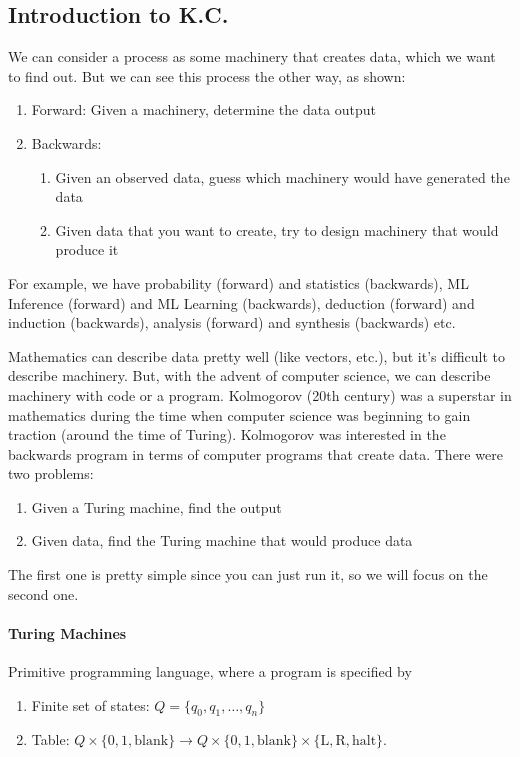 \documentclass[12pt]{article}
\theoremstyle{remark}
\begin{document}
\subsection{Introduction to K.C.}
We can consider a process as some machinery that creates data, which we want to find out. But we can see this process the other way, as shown:
\begin{enumerate}
    \item Forward: Given a machinery, determine the data output
    \item Backwards: \begin{enumerate}
        \item Given an observed data, guess which machinery would have generated the data
        \item Given data that you want to create, try to design machinery that would produce it
    \end{enumerate}
\end{enumerate}
For example, we have probability (forward) and statistics (backwards), ML Inference (forward) and ML Learning (backwards), deduction (forward) and induction (backwards), analysis (forward) and synthesis (backwards) etc.

Mathematics can describe data pretty well (like vectors, etc.), but it's difficult to describe machinery. But, with the advent of computer science, we can describe machinery with code or a program. Kolmogorov (20th century) was a superstar in mathematics during the time when computer science was beginning to gain traction (around the time of Turing). Kolmogorov was interested in the backwards program in terms of computer programs that create data. There were two problems:
\begin{enumerate}
    \item Given a Turing machine, find the output
    \item Given data, find the Turing machine that would produce data
\end{enumerate}
The first one is pretty simple since you can just run it, so we will focus on the second one.

\paragraph{Turing Machines}
Primitive programming language, where a program is specified by
\begin{enumerate}
    \item Finite set of states: $Q=\{q_0,q_1,\dots,q_n\}$
    \item Table: $Q\times\{0,1,\text{blank}\}\to Q\times\{0,1,\text{blank}\}\times\{\text{L},\text{R},\text{halt}\}.$
\end{enumerate}
\end{document}
